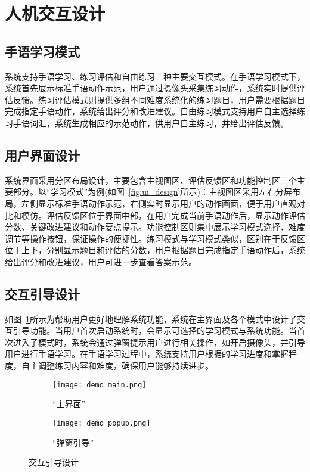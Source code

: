 \section{人机交互设计}

\subsection{手语学习模式}
系统支持手语学习、练习评估和自由练习三种主要交互模式。在手语学习模式下，系统首先展示标准手语动作示范，用户通过摄像头采集练习动作，系统实时提供评估反馈。练习评估模式则提供多组不同难度系统化的练习题目，用户需要根据题目完成指定手语动作，系统给出评分和改进建议。自由练习模式支持用户自主选择练习手语词汇，系统生成相应的示范动作，供用户自主练习，并给出评估反馈。

\subsection{用户界面设计}
系统界面采用分区布局设计，主要包含主视图区、评估反馈区和功能控制区三个主要部分。以“学习模式”为例(如图~\ref{fig:ui_design}所示)：主视图区采用左右分屏布局，左侧显示标准手语动作示范，右侧实时显示用户的动作画面，便于用户直观对比和模仿。评估反馈区位于界面中部，在用户完成当前手语动作后，显示动作评估分数、关键改进建议和动作要点提示。功能控制区则集中展示学习模式选择、难度调节等操作按钮，保证操作的便捷性。练习模式与学习模式类似，区别在于反馈区位于上下，分别显示题目和评估的分数，用户根据题目完成指定手语动作后，系统给出评分和改进建议，用户可进一步查看答案示范。



\subsection{交互引导设计}
如图~\ref{fig:ui_interaction}所示为帮助用户更好地理解系统功能，系统在主界面及各个模式中设计了交互引导功能。当用户首次启动系统时，会显示可选择的学习模式与系统功能。当首次进入子模式时，系统会通过弹窗提示用户进行相关操作，如开启摄像头，并引导用户进行手语学习。在手语学习过程中，系统支持用户根据的学习进度和掌握程度，自主调整练习内容和难度，确保用户能够持续进步。

\begin{figure}
    \centering
    \begin{subfigure}[b]{0.48\linewidth}
        \centering
        \texttt{[image: demo\_main.png]}
        \caption{“主界面”}
    \end{subfigure}
    \hfill
    \begin{subfigure}[b]{0.48\linewidth}
        \centering
        \texttt{[image: demo\_popup.png]}
        \caption{“弹窗引导”}
    \end{subfigure}
    \caption{交互引导设计}
    \label{fig:ui_interaction}
  \end{figure}


